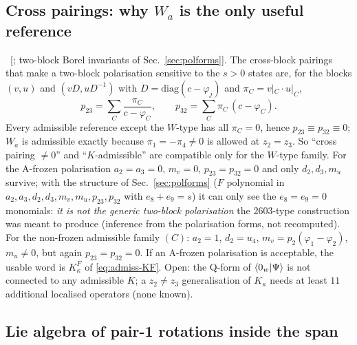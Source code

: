 \subsection{Cross pairings: why $W_a$ is the only useful reference}\label{sec:admiss-cross}

\ex\ [; two-block Borel invariants of Sec.~\ref{sec:polforms}]. The cross-block pairings that make a two-block polarisation sensitive to the $s>0$ states are, for the blocks $(v,u)$ and $(vD,uD^{-1})$ with $D=\mathrm{diag}(c-\varphi_j)$ and $\pi_C=v|_C\cdot u|_C$,
\begin{equation}
 p_{23}=\sum_C\frac{\pi_C}{c-\varphi_C},\qquad p_{32}=\sum_C\pi_C\,(c-\varphi_C).
\end{equation}
Every admissible reference except the $W$-type has all $\pi_C=0$, hence $p_{23}\equiv p_{32}\equiv0$; $W_a$ is admissible exactly because $\pi_1=-\pi_4\ne0$ is allowed at $z_2=z_3$. So ``cross pairing $\ne0$'' and ``$K$-admissible'' are compatible only for the $W$-type family.
For the A-frozen polarisation $a_2=a_3=0$, $m_v=0$, $p_{23}=p_{32}=0$ and only $d_2,d_3,m_u$ survive; with the structure of Sec.~\ref{sec:polforms} ($F$ polynomial in $a_2,a_3,d_2,d_3,m_v,m_u,p_{23},p_{32}$ with $e_8+e_9=s$) it can only see the $e_8=e_9=0$ monomials: \emph{it is not the generic two-block polarisation} the 2603-type construction was meant to produce
(inference from the polarisation forms, not recomputed). For the non-frozen admissible family $(C)$: $a_2=1$, $d_2=u_4$, $m_v=p_2(\varphi_1-\varphi_2)$, $m_u\ne0$, but again $p_{23}=p_{32}=0$. If an A-frozen polarisation is acceptable, the usable word is $K^F_\kappa$ of \eqref{eq:admiss-KF}.
Open: the Q-form of $\langle0_w|\Psi\rangle$ is not connected to any admissible $K$; a $z_2\ne z_3$ generalisation of $K_\kappa$ needs at least $11$ additional localised operators (none known).

\subsection{Lie algebra of pair-1 rotations inside the span}\label{sec:admiss-lie}

